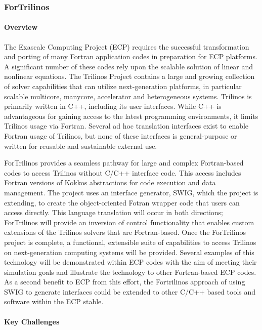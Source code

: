 \subsubsection{ ForTrilinos}

\paragraph{Overview}

The Exascale Computing Project (ECP) requires the successful transformation and porting of many Fortran application codes in preparation for ECP platforms. A significant number of these codes rely upon the scalable solution of linear and nonlinear equations. The Trilinos Project contains a large and growing collection of solver capabilities that can utilize next-generation platforms, in particular scalable multicore, manycore, accelerator and heterogeneous systems. Trilinos is primarily written in C++, including its user interfaces. While C++ is advantageous for gaining access to the latest programming environments, it limits Trilinos usage via Fortran. Several ad hoc translation interfaces exist to enable Fortran usage of Trilinos, but none of these interfaces is general-purpose or written for reusable and sustainable external use.

ForTrilinos provides a seamless pathway for large and complex Fortran-based codes to access Trilinos without C/C++ interface code. This access includes Fortran versions of Kokkos abstractions for code execution and data management. The project uses an interface generator, SWIG, which the project is extending, to create the object-oriented Fotran wrapper code that users can access directly. This language translation will occur in both directions; ForTrilinos will provide an inversion of control functionality that enables custom extensions of the Trilinos solvers that are Fortran-based. Once the ForTrilinos project is complete, a functional, extensible suite of capabilities to access Trilinos on next-generation computing systems will be provided. Several examples of this technology will be demonstrated within ECP codes with the aim of meeting their simulation goals and illustrate the technology to other Fortran-based ECP codes. As a second benefit to ECP from this effort, the Fortrilinos approach of using SWIG to generate interfaces could be extended to other C/C++ based tools and software within the ECP stable.

\paragraph{Key  Challenges}

